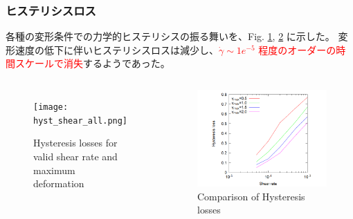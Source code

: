 \documentclass[12pt, dvipdfmx]{beamer}
\begin{document}
\begin{frame}
	\frametitle{ヒステリシスロス}
	各種の変形条件での力学的ヒステリシスの振る舞いを、Fig. \ref{hystall}, \ref{hystallcomp} に示した。
	変形速度の低下に伴いヒステリシスロスは減少し、\textcolor{red}{$\dot{\gamma} \sim 1e^{-5}$ 程度のオーダーの時間スケールで消失}するようであった。
	\begin{columns}[totalwidth=\linewidth]
			\begin{figure}[htb]
				\centering
					\texttt{[image: hyst\_shear\_all.png]}
					\caption{Hysteresis losses for valid shear rate and maximum deformation}
					\label{hystall}
			\end{figure}
		\begin{figure}[htb]
			\centering
				\includegraphics[width=.8\textwidth]{hyst_shear.png}
				\caption{Comparison of Hysteresis losses}
				\label{hystallcomp}
		\end{figure}
		\end{columns}
\end{frame}
\end{document}
